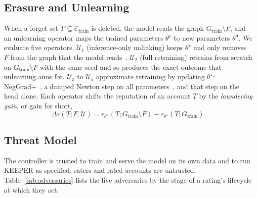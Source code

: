 \documentclass[lettersize,journal]{IEEEtran}
\begin{document}
\subsection{Erasure and Unlearning}
\label{subsec:operators}

When a forget set $F \subseteq \mathcal{E}_{\mathrm{train}}$ is deleted, the model reads the graph $G_{\mathrm{train}} \setminus F$, and an unlearning operator maps the trained parameters $\theta^\star$ to new parameters $\theta^{\mathrm{u}}$.
We evaluate five operators.
$\mathcal{U}_1$ (inference-only unlinking) keeps $\theta^\star$ and only removes $F$ from the graph that the model reads~\cite{tan2024unlink}.
$\mathcal{U}_2$ (full retraining) retrains from scratch on $G_{\mathrm{train}} \setminus F$ with the same seed and so produces the exact outcome that unlearning aims for.
$\mathcal{U}_3$ to $\mathcal{U}_5$ approximate retraining by updating $\theta^\star$: NegGrad+~\cite{kurmanji2024towards}, a damped Newton step on all parameters~\cite{wu2023gif}, and that step on the head alone.
Each operator shifts the reputation of an account $T$ by the \emph{laundering gain}, or gain for short,
\begin{equation}
\label{eq:gain}
\Delta r(T; F, \mathcal{U}) = r_{\theta^{\mathrm{u}}}(T; G_{\mathrm{train}} \setminus F) - r_{\theta^\star}(T; G_{\mathrm{train}}).
\end{equation}

\subsection{Threat Model}
\label{sec:threat_model}

The controller is trusted to train and serve the model on its own data and to run KEEPER as specified; raters and rated accounts are untrusted.
Table~\ref{tab:adversaries} lists the five adversaries by the stage of a rating's lifecycle at which they act.
\end{document}
